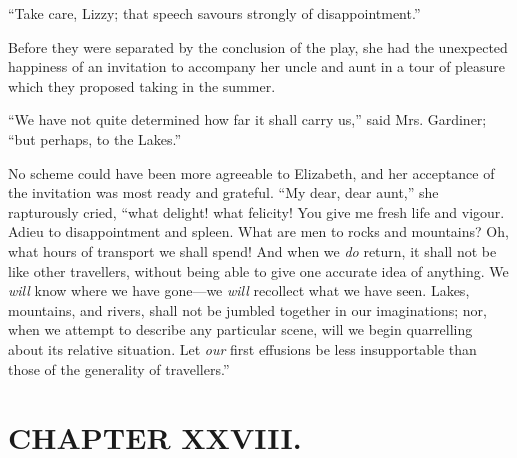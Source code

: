 ``Take care, Lizzy; that speech savours strongly of disappointment.''

Before they were separated by the conclusion of the play, she had the unexpected happiness of an invitation to accompany her uncle and aunt in a tour of pleasure which they proposed taking in the summer.

``We have not quite determined how far it shall carry us,'' said Mrs. Gardiner; ``but perhaps, to the Lakes.''

No scheme could have been more agreeable to Elizabeth, and her acceptance of the invitation was most ready and grateful. ``My dear, dear aunt,'' she rapturously cried, ``what delight! what felicity! You give me fresh life and vigour. Adieu to disappointment and spleen. What are men to rocks and mountains? Oh, what hours of transport we shall spend! And when we \textit{do} return, it shall not be like other travellers, without being able to give one accurate idea of anything. We \textit{will} know where we have gone---we \textit{will} recollect what we have seen. Lakes, mountains, and rivers, shall not be jumbled together in our imaginations; nor, when we attempt to describe any particular scene, will we begin quarrelling about its relative situation. Let \textit{our} first effusions be less insupportable than those of the generality of travellers.''



\chapter{CHAPTER XXVIII.}

